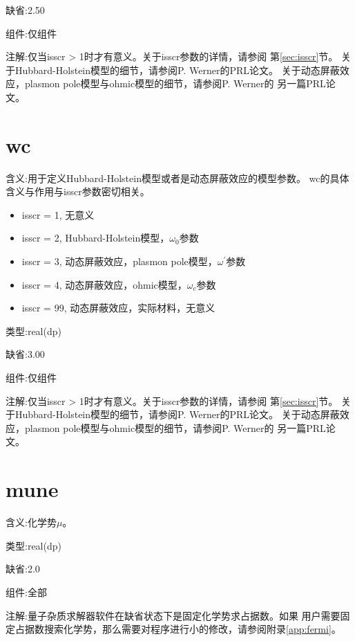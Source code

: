 {\color{blue}缺省}:2.50

{\color{brown}组件}:仅{\narcissus}组件

{\color{purple}注解}:仅当isscr > 1时才有意义。关于isscr参数的详情，请参阅
第\ref{sec:isscr}节。
关于Hubbard-Holstein模型的细节，请参阅P. Werner的PRL论文\cite{werner:146404}。
关于动态屏蔽效应，plasmon pole模型与ohmic模型的细节，请参阅P. Werner的
另一篇PRL论文\cite{werner:2010}。

\section{wc    }
\label{sec:wc}

{\color{red}含义}:用于定义Hubbard-Holstein模型或者是动态屏蔽效应的模型参数。
wc的具体含义与作用与isscr参数密切相关。

\begin{itemize}
\item isscr = 1, 无意义
\item isscr = 2, Hubbard-Holstein模型，$\omega_{0}$参数
\item isscr = 3, 动态屏蔽效应，plasmon pole模型，$\omega^{\prime}$参数
\item isscr = 4, 动态屏蔽效应，ohmic模型，$\omega_{c}$参数
\item isscr = 99, 动态屏蔽效应，实际材料，无意义
\end{itemize}

{\color{green}类型}:real(dp)

{\color{blue}缺省}:3.00

{\color{brown}组件}:仅{\narcissus}组件

{\color{purple}注解}:仅当isscr > 1时才有意义。关于isscr参数的详情，请参阅
第\ref{sec:isscr}节。
关于Hubbard-Holstein模型的细节，请参阅P. Werner的PRL论文\cite{werner:146404}。
关于动态屏蔽效应，plasmon pole模型与ohmic模型的细节，请参阅P. Werner的
另一篇PRL论文\cite{werner:2010}。

\section{mune  }
\label{sec:mune}

{\color{red}含义}:化学势$\mu$。

{\color{green}类型}:real(dp)

{\color{blue}缺省}:2.0

{\color{brown}组件}:全部

{\color{purple}注解}:量子杂质求解器软件在缺省状态下是固定化学势求占据数。如果
用户需要固定占据数搜索化学势，那么需要对程序进行小的修改，请参阅附录\ref{app:fermi}。

